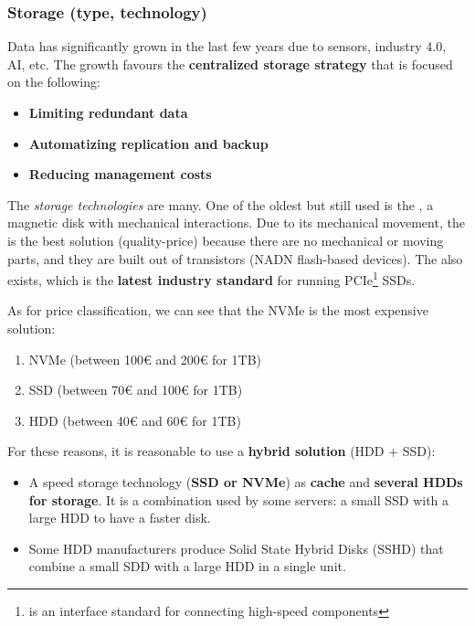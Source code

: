 \newpage

\subsubsection{Storage (type, technology)}\label{subsubsection: Storage (type, technology)}

Data has significantly grown in the last few years due to sensors, industry 4.0, AI, etc. The growth favours the \textbf{centralized storage strategy} that is focused on the following:
\begin{itemize}
    \item \textbf{Limiting redundant data}
    \item \textbf{Automatizing replication and backup}
    \item \textbf{Reducing management costs}
\end{itemize}

\highspace
The \emph{storage technologies} are many. One of the oldest but still used is the , a magnetic disk with mechanical interactions. Due to its mechanical movement, the  is the best solution (quality-price) because there are no mechanical or moving parts, and they are built out of transistors (NADN flash-based devices). The  also exists, which is the \textbf{latest industry standard} for running PCIe\footnote{ is an interface standard for connecting high-speed components} SSDs.

\highspace
As for price classification, we can see that the NVMe is the most expensive solution:
\begin{enumerate}
    \item NVMe (between 100€ and 200€ for 1TB)
    \item SSD (between 70€ and 100€ for 1TB)
    \item HDD (between 40€ and 60€ for 1TB)
\end{enumerate}
For these reasons, it is reasonable to use a \textbf{hybrid solution} (HDD + SSD):
\begin{itemize}
    \item A speed storage technology (\textbf{SSD or NVMe}) as \textbf{cache} and \textbf{several HDDs for storage}. It is a combination used by some servers: a small SSD with a large HDD to have a faster disk.
    
    \item Some HDD manufacturers produce Solid State Hybrid Disks (SSHD) that combine a small SDD with a large HDD in a single unit.
\end{itemize}

